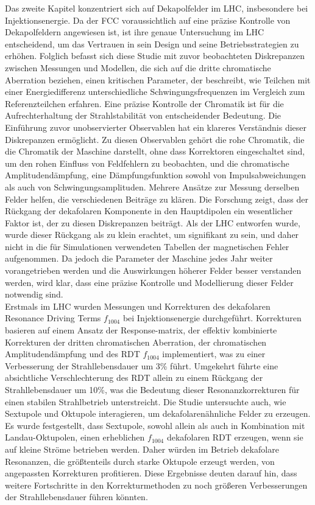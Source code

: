 {%
Das zweite Kapitel konzentriert sich auf Dekapolfelder im LHC, insbesondere bei Injektionsenergie. Da der FCC voraussichtlich auf eine präzise Kontrolle von Dekapolfeldern angewiesen ist, ist ihre genaue Untersuchung im LHC entscheidend, um das Vertrauen in sein Design und seine Betriebsstrategien zu erhöhen. Folglich befasst sich diese Studie mit zuvor beobachteten Diskrepanzen zwischen Messungen und Modellen, die sich auf die dritte chromatische Aberration beziehen, einen kritischen Parameter, der beschreibt, wie Teilchen mit einer Energiedifferenz unterschiedliche Schwingungsfrequenzen im Vergleich zum Referenzteilchen erfahren. Eine präzise Kontrolle der Chromatik ist für die Aufrechterhaltung der Strahlstabilität von entscheidender Bedeutung. Die Einführung zuvor unobservierter Observablen hat ein klareres Verständnis dieser Diskrepanzen ermöglicht. Zu diesen Observablen gehört die rohe Chromatik, die die Chromatik der Maschine darstellt, ohne dass Korrektoren eingeschaltet sind, um den rohen Einfluss von Feldfehlern zu beobachten, und die chromatische Amplitudendämpfung, eine Dämpfungsfunktion sowohl von Impulsabweichungen als auch von Schwingungsamplituden. Mehrere Ansätze zur Messung derselben Felder helfen, die verschiedenen Beiträge zu klären. Die Forschung zeigt, dass der Rückgang der dekafolaren Komponente in den Hauptdipolen ein wesentlicher Faktor ist, der zu diesen Diskrepanzen beiträgt. Als der LHC entworfen wurde, wurde dieser Rückgang als zu klein erachtet, um signifikant zu sein, und daher nicht in die für Simulationen verwendeten Tabellen der magnetischen Fehler aufgenommen. Da jedoch die Parameter der Maschine jedes Jahr weiter vorangetrieben werden und die Auswirkungen höherer Felder besser verstanden werden, wird klar, dass eine präzise Kontrolle und Modellierung dieser Felder notwendig sind.
\\
\indent
Erstmals im LHC wurden Messungen und Korrekturen des dekafolaren Resonance Driving Terms $f_{1004}$ bei Injektionsenergie durchgeführt. Korrekturen basieren auf einem Ansatz der Response-matrix, der effektiv kombinierte Korrekturen der dritten chromatischen Aberration, der chromatischen Amplitudendämpfung und des RDT $f_{1004}$ implementiert, was zu einer Verbesserung der Strahllebensdauer um 3\% führt. Umgekehrt führte eine absichtliche Verschlechterung des RDT allein zu einem Rückgang der Strahllebensdauer um 10\%, was die Bedeutung dieser Resonanzkorrekturen für einen stabilen Strahlbetrieb unterstreicht. Die Studie untersuchte auch, wie Sextupole und Oktupole interagieren, um dekafolarenähnliche Felder zu erzeugen. Es wurde festgestellt, dass Sextupole, sowohl allein als auch in Kombination mit Landau-Oktupolen, einen erheblichen $f_{1004}$ dekafolaren RDT erzeugen, wenn sie auf kleine Ströme betrieben werden. Daher würden im Betrieb dekafolare Resonanzen, die größtenteils durch starke Oktupole erzeugt werden, von angepassten Korrekturen profitieren. Diese Ergebnisse deuten darauf hin, dass weitere Fortschritte in den Korrekturmethoden zu noch größeren Verbesserungen der Strahllebensdauer führen könnten.

}
